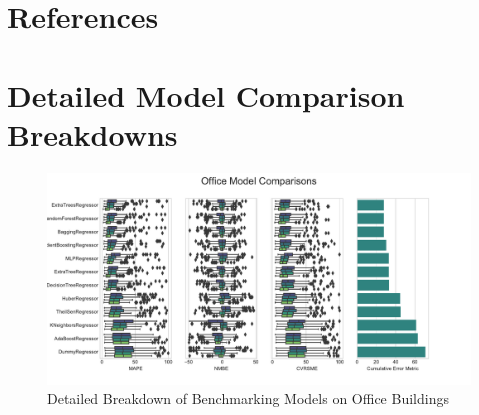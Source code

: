 \documentclass[preprint,12pt]{elsarticle}
\begin{document}
\section{References}









\appendix
\section{Detailed Model Comparison Breakdowns}
\label{detailedmodels}

\begin{figure}[ht!]
\begin{center}
\includegraphics[width=1\columnwidth]{figures/Office_boxplot.pdf}
\caption{Detailed Breakdown of Benchmarking Models on Office Buildings}
\label{fig:offices}%
\end{center}
\end{figure}
\end{document}
